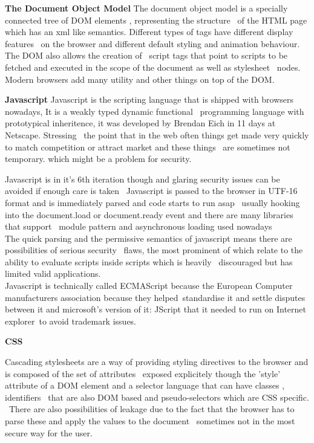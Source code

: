 \textbf{The Document Object Model}
The document object model is a specially connected tree of DOM elements , representing the structure \
of the HTML page which has an xml like semantics. Different types of tags have different display features \
on the browser and different default styling and animation behaviour. The DOM also allows the creation of \
script tags that point to scripts to be fetched and executed in the scope of the document as well as stylesheet \
nodes. Modern browsers add many utility and other things on top of the DOM.

\textbf{Javascript}
Javascript is the scripting language that is shipped with browsers nowadays, It is a weakly typed dynamic functional \
programming language with prototypical inheritence, it was developed by Brendan Eich in 11 days at Netscape. Stressing \
the point that in the web often things get made very quickly to match competition or attract market and these things \
are sometimes not temporary. which might be a problem for security.

Javascript is in it's 6th iteration though and glaring security issues can be avoided if enough care is taken \
Javascript is passed to the browser in UTF-16 format and is immediately parsed and code starts to run asap \ 
usually hooking into the document.load or document.ready event and there are many libraries that support \
module pattern and asynchronous loading used nowadays\\

The quick parsing and the permissive semantics of javascript means there are possibilities of serious security \
flaws, the most prominent of which relate to the ability to evaluate scripts inside scripts which is heavily \
discouraged but has limited valid applications.\\

Javascript is technically called ECMAScript because the European Computer manufacturers association because they helped\
standardise it and settle disputes between it and microsoft's version of it: JScript that it needed to run on Internet explorer\
to avoid trademark issues.

\textbf{CSS}

Cascading stylesheets are a way of providing styling directives to the browser and is composed of the set of attributes \
exposed explicitely though the 'style' attribute of a DOM element and a selector language that can have classes , identifiers \
that are also DOM based and pseudo-selectors which are CSS specific. \
There are also possibilities of leakage due to the fact that the browser has to parse these and apply the values to the document \
sometimes not in the most secure way for the user.\\

